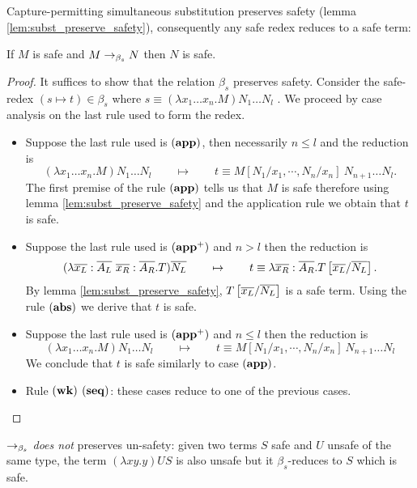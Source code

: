 Capture-permitting simultaneous substitution preserves safety (lemma
\ref{lem:subst_preserve_safety}), consequently any safe redex
reduces to a safe term:

\begin{lem}
\label{lem:homoh_safered_preserve_safety}
If $M$ is safe and $M \rightarrow_{\beta_s} N$ then $N$ is safe.
\end{lem}

\begin{proof}
It suffices to show that the relation $\beta_s$ preserves safety.
Consider the safe-redex $(s\mapsto t) \in \beta_s$ where $ s \equiv (\lambda x_1 \ldots x_n . M) N_1 \ldots N_l $ .
We proceed by case analysis on the last rule used to form the redex.
\begin{itemize}
\item Suppose the last rule used is $\mathbf{(app)}$, then necessarily $n\leq l$ and the reduction is
$$(\lambda x_1 \ldots x_n . M) N_1 \ldots N_l \qquad \mapsto  \qquad t \equiv M[N_1 / x_1 , \cdots, N_n / x_n]\ N_{n+1} \ldots N_l.$$
The first premise of the rule $\mathbf{(app)}$ tells us that $M$ is safe therefore using lemma \ref{lem:subst_preserve_safety} and
the application rule we obtain that $t$ is safe.

\item Suppose the last rule used is $\mathbf{(app^+)}$ and $n> l$ then the reduction is
$$ (\lambda \overline{x_L} : \overline{A_L} \
\overline{x_R}: \overline{A_R} . T) \overline{N_L} \qquad \mapsto
\qquad t \equiv \lambda \overline{x_R}: \overline{A_R} .
T\left[ \overline{x_L}/\overline{N_L} \right].
$$
By lemma \ref{lem:subst_preserve_safety}, $T\left[ \overline{x_L}/\overline{N_L} \right]$ is a safe term.
Using the rule $\mathbf{(abs)}$ we derive that $t$ is safe.

\item Suppose the last rule used is $\mathbf{(app^+)}$ and $n\leq l$ then the reduction is
$$(\lambda x_1 \ldots x_n . M) N_1 \ldots N_l \qquad \mapsto \qquad t \equiv M[N_1 / x_1 , \cdots, N_n / x_n]\ N_{n+1} \ldots N_l$$
We conclude that $t$ is safe similarly to case $\mathbf{(app)}$.

\item Rule $\mathbf{(wk)}$ $\mathbf{(seq)}$: these cases reduce to one of the previous cases.
\end{itemize}
\end{proof}


\begin{rem}
\label{rem:betasred_notpreserv_unsafety} $\rightarrow_{\beta_s}$ \emph{does not}
preserves un-safety: given two terms $S$ safe and $U$ unsafe of the
same type, the term $(\lambda x y . y) U S$ is also unsafe but it
$\beta_s$-reduces to $S$ which is safe.
\end{rem}


